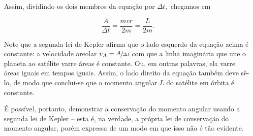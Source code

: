 \begin{exemplo}
Assim, dividindo os dois membros da equação por $\Delta t,$ chegamos em

$$ \dfrac{A}{\Delta t} = \dfrac{mvr}{2m} = \dfrac{L}{2m}.$$

Note que a segunda lei de Kepler afirma que o lado esquerdo da equação acima é constante: a velocidade areolar $v_A=\sfrac{A}{\Delta t}$ com que a linha imaginária que une o planeta ao satélite varre áreas é constante. Ou, em outras palavras, ela varre áreas iguais em tempos iguais. Assim, o lado direito da equação também deve sê-lo, de modo que conclui-se que o momento angular $L$ do satélite em órbita é constante.

É possível, portanto, demonstrar a conservação do momento angular usando a segunda lei de Kepler -- esta é, na verdade, a própria lei de conservação do momento angular, porém expressa de um modo em que isso não é tão evidente.

\end{exemplo}



\vspace{0.3cm}














